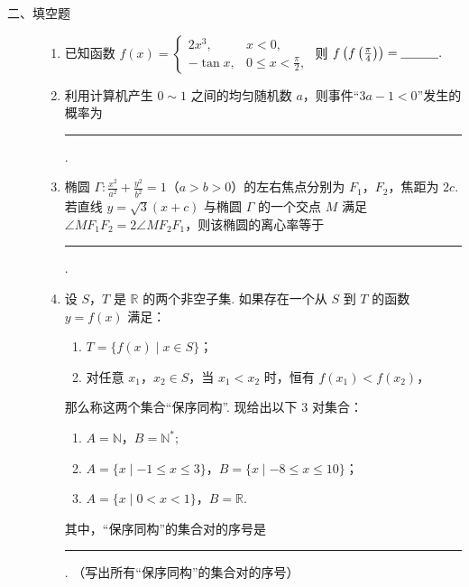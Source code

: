 \begin{description}

    \item[二、填空题]

    \begin{enumerate}[leftmargin=5pt]

      \addtocounter{enumi}{+12}

        \item 已知函数 \(f(x) = \begin{cases}
2x^{3}, & x < 0,\\
-\tan x, & 0 \leqslant x < \frac{\pi}{2},
\end{cases}\) 则 \(f\left(f\left(\frac{\pi}{4}\right)\right)=\rule[-0.3ex]{3em}{0.4pt}.\)

        \item 利用计算机产生 \(0 \sim 1\) 之间的均匀随机数 \(a\)，则事件“\(3a - 1 < 0\)”发生的概率为\rule[-0.3ex]{3em}{0.4pt}.

        \item 椭圆 \(\Gamma: \frac{x^2}{a^2} + \frac{y^2}{b^2} = 1\)（\(a > b > 0\)）的左右焦点分别为 \(F_1\)，\(F_2\)，焦距为 \(2c\). 若直线 \(y = \sqrt{3}(x + c)\) 与椭圆 \(\Gamma\) 的一个交点 \(M\) 满足 \(\angle MF_1F_2 = 2\angle MF_2F_1\)，则该椭圆的离心率等于\rule[-0.3ex]{3em}{0.4pt}.

        \item 设 \(S\)，\(T\) 是 \(\mathbb{R}\) 的两个非空子集. 如果存在一个从 \(S\) 到 \(T\) 的函数 \(y = f(x)\) 满足：
\begin{enumerate}
\item \(T = \{f(x)\mid x\in S\}\)；
\item 对任意 \(x_{1}\)，\(x_{2} \in S\)，当 \(x_{1} < x_{2}\) 时，恒有 \(f(x_{1}) < f(x_{2})\)，
\end{enumerate}
那么称这两个集合“保序同构”. 现给出以下 3 对集合：
\begin{enumerate}
\item \(A = \mathbb{N}\)，\(B = \mathbb{N}^{*};\)
\item \(A = \{x\mid -1\leqslant x\leqslant 3\}\)，\(B = \{x\mid -8\leqslant x\leqslant 10\}\)；
\item \( A = \{x \mid 0 < x < 1\} \)，\( B = \mathbb{R} \).
\end{enumerate}
其中，“保序同构”的集合对的序号是\rule[-0.3ex]{3em}{0.4pt}. （写出所有“保序同构”的集合对的序号）

    \end{enumerate}

\end{description}

